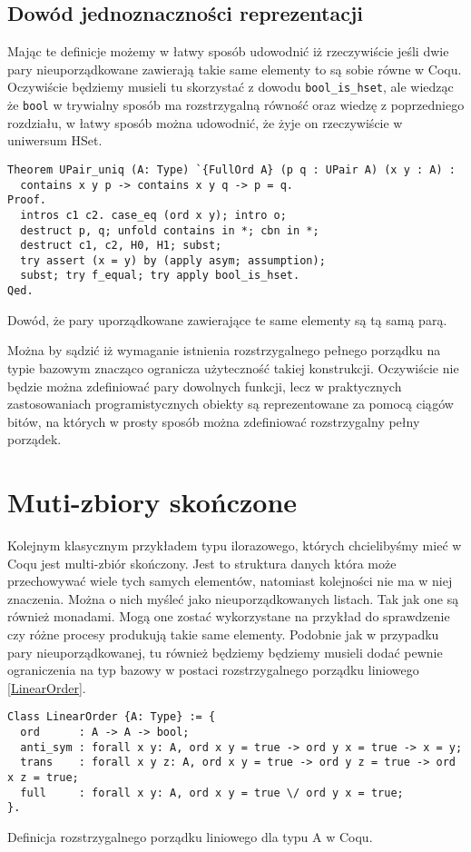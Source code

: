\subsection{Dowód jednoznaczności reprezentacji}
Mając te definicje możemy w łatwy sposób udowodnić iż rzeczywiście jeśli dwie pary nieuporządkowane zawierają takie same elementy to są sobie równe w Coqu. Oczywiście będziemy musieli tu skorzystać z dowodu \texttt{bool_is_hset}, ale wiedząc że \texttt{bool} w trywialny sposób ma rozstrzygalną równość oraz wiedzę z poprzedniego rozdziału, w łatwy sposób można udowodnić, że żyje on rzeczywiście w uniwersum HSet.
\begin{code}
\begin{verbatim}
Theorem UPair_uniq (A: Type) `{FullOrd A} (p q : UPair A) (x y : A) :
  contains x y p -> contains x y q -> p = q.
Proof.
  intros c1 c2. case_eq (ord x y); intro o;
  destruct p, q; unfold contains in *; cbn in *; 
  destruct c1, c2, H0, H1; subst; 
  try assert (x = y) by (apply asym; assumption);
  subst; try f_equal; try apply bool_is_hset.
Qed.
\end{verbatim}
\caption{Dowód, że pary uporządkowane zawierające te same elementy są tą samą parą.}
\label{UPair_uniq}
\end{code}
Można by sądzić iż wymaganie istnienia rozstrzygalnego pełnego porządku na typie bazowym znacząco ogranicza użyteczność takiej konstrukcji. Oczywiście nie będzie można zdefiniować pary dowolnych funkcji, lecz w praktycznych zastosowaniach programistycznych obiekty są reprezentowane za pomocą ciągów bitów, na których w prosty sposób można zdefiniować rozstrzygalny pełny porządek.


\section{Muti-zbiory skończone}
Kolejnym klasycznym przykładem typu ilorazowego, których chcielibyśmy mieć w Coqu jest multi-zbiór skończony. Jest to struktura danych która może przechowywać wiele tych samych elementów, natomiast kolejności nie ma w niej znaczenia. Można o nich myśleć jako nieuporządkowanych listach. Tak jak one są również monadami. Mogą one zostać wykorzystane na przykład do sprawdzenie czy różne procesy produkują takie same elementy. Podobnie jak w przypadku pary nieuporządkowanej, tu również będziemy będziemy musieli dodać pewnie ograniczenia na typ bazowy w postaci rozstrzygalnego porządku liniowego \ref{LinearOrder}. 
\begin{code}
\begin{verbatim}
Class LinearOrder {A: Type} := {
  ord      : A -> A -> bool;
  anti_sym : forall x y: A, ord x y = true -> ord y x = true -> x = y;
  trans    : forall x y z: A, ord x y = true -> ord y z = true -> ord x z = true;
  full     : forall x y: A, ord x y = true \/ ord y x = true;
}.
\end{verbatim}
\caption{Definicja rozstrzygalnego porządku liniowego dla typu A w Coqu.}
\label{LinearOrder}
\end{code}
